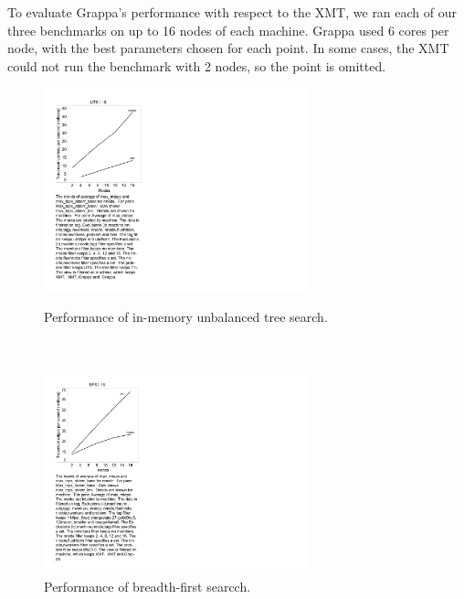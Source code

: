 To evaluate Grappa's performance with respect to the XMT, we ran each of our three benchmarks on up to 16 nodes of each machine. Grappa used 6 cores per node, with the best parameters chosen for each point. In some cases, the XMT could not run the benchmark with 2 nodes, so the point is omitted.

\begin{figure}
\begin{center}

\hspace{-1in}\begin{minipage}{0.3\textwidth}
\begin{center}
\includegraphics[width=3in]{figs/uts_performance.pdf}
\caption{\label{fig:uts_compare} Performance of in-memory unbalanced tree search.}
\end{center}
\end{minipage}
\hspace{1.25in}\
\begin{minipage}{0.3\textwidth}
\begin{center}
\includegraphics[width=3in]{figs/bfs_performance}
\caption{\label{fig:bfs-performance} Performance of breadth-first searcch.}
\end{center}
\end{minipage}

\end{center}
\end{figure}

